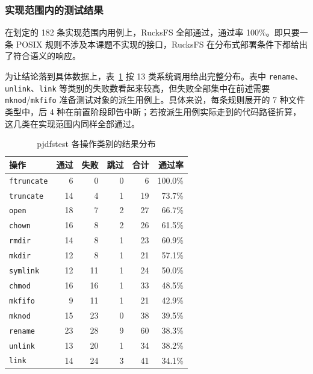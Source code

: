 \subsubsection{实现范围内的测试结果}

在划定的 182 条实现范围内用例上，RucksFS 全部通过，通过率 100\%。即只要一条 POSIX 规则不涉及本课题不实现的接口，RucksFS 在分布式部署条件下都给出了符合语义的响应。

为让结论落到具体数据上，表~\ref{tab:pjdfstest-by-category} 按 13 类系统调用给出完整分布。表中 \texttt{rename}、\texttt{unlink}、\texttt{link} 等类别的失败数看起来较高，但失败全部集中在前述需要 \texttt{mknod}/\texttt{mkfifo} 准备测试对象的派生用例上。具体来说，每条规则展开的 7 种文件类型中，后 4 种在前置阶段即告中断；若按派生用例实际走到的代码路径折算，这几类在实现范围内同样全部通过。

\begin{table}[htbp]
    \centering
    \caption{pjdfstest 各操作类别的结果分布}
    \label{tab:pjdfstest-by-category}
    \small
    \begin{tabular}{lrrrrr}
        \toprule
        操作 & 通过 & 失败 & 跳过 & 合计 & 通过率 \\
        \midrule
        \texttt{ftruncate}  & 6   & 0   & 0   & 6   & 100.0\% \\
        \texttt{truncate}   & 14  & 4   & 1   & 19  & 73.7\%  \\
        \texttt{open}       & 18  & 7   & 2   & 27  & 66.7\%  \\
        \texttt{chown}      & 16  & 8   & 2   & 26  & 61.5\%  \\
        \texttt{rmdir}      & 14  & 8   & 1   & 23  & 60.9\%  \\
        \texttt{mkdir}      & 12  & 8   & 1   & 21  & 57.1\%  \\
        \texttt{symlink}    & 12  & 11  & 1   & 24  & 50.0\%  \\
        \texttt{chmod}      & 16  & 16  & 1   & 33  & 48.5\%  \\
        \texttt{mkfifo}     & 9   & 11  & 1   & 21  & 42.9\%  \\
        \texttt{mknod}      & 15  & 23  & 0   & 38  & 39.5\%  \\
        \texttt{rename}     & 23  & 28  & 9   & 60  & 38.3\%  \\
        \texttt{unlink}     & 13  & 20  & 1   & 34  & 38.2\%  \\
        \texttt{link}       & 14  & 24  & 3   & 41  & 34.1\%  \\
        \bottomrule
    \end{tabular}
\end{table}

